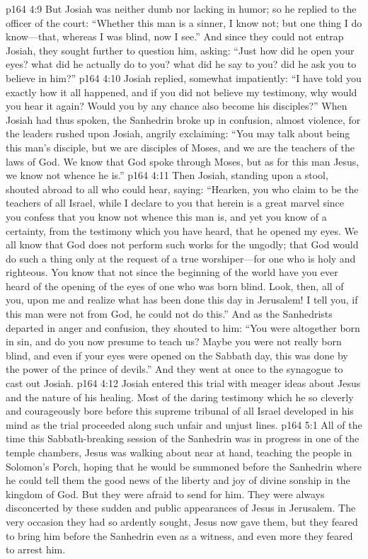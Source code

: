 \vs p164 4:9 But Josiah was neither dumb nor lacking in humor; so he replied to the officer of the court: “Whether this man is a sinner, I know not; but one thing I do know---that, whereas I was blind, now I see.” And since they could not entrap Josiah, they sought further to question him, asking: “Just how did he open your eyes? what did he actually do to you? what did he say to you? did he ask you to believe in him?”
\vs p164 4:10 Josiah replied, somewhat impatiently: “I have told you exactly how it all happened, and if you did not believe my testimony, why would you hear it again? Would you by any chance also become his disciples?” When Josiah had thus spoken, the Sanhedrin broke up in confusion, almost violence, for the leaders rushed upon Josiah, angrily exclaiming: “You may talk about being this man’s disciple, but we are disciples of Moses, and we are the teachers of the laws of God. We know that God spoke through Moses, but as for this man Jesus, we know not whence he is.”
\vs p164 4:11 Then Josiah, standing upon a stool, shouted abroad to all who could hear, saying: “Hearken, you who claim to be the teachers of all Israel, while I declare to you that herein is a great marvel since you confess that you know not whence this man is, and yet you know of a certainty, from the testimony which you have heard, that he opened my eyes. We all know that God does not perform such works for the ungodly; that God would do such a thing only at the request of a true worshiper---for one who is holy and righteous. You know that not since the beginning of the world have you ever heard of the opening of the eyes of one who was born blind. Look, then, all of you, upon me and realize what has been done this day in Jerusalem! I tell you, if this man were not from God, he could not do this.” And as the Sanhedrists departed in anger and confusion, they shouted to him: “You were altogether born in sin, and do you now presume to teach us? Maybe you were not really born blind, and even if your eyes were opened on the Sabbath day, this was done by the power of the prince of devils.” And they went at once to the synagogue to cast out Josiah.
\vs p164 4:12 Josiah entered this trial with meager ideas about Jesus and the nature of his healing. Most of the daring testimony which he so cleverly and courageously bore before this supreme tribunal of all Israel developed in his mind as the trial proceeded along such unfair and unjust lines.
\vs p164 5:1 All of the time this Sabbath\hyp{}breaking session of the Sanhedrin was in progress in one of the temple chambers, Jesus was walking about near at hand, teaching the people in Solomon’s Porch, hoping that he would be summoned before the Sanhedrin where he could tell them the good news of the liberty and joy of divine sonship in the kingdom of God. But they were afraid to send for him. They were always disconcerted by these sudden and public appearances of Jesus in Jerusalem. The very occasion they had so ardently sought, Jesus now gave them, but they feared to bring him before the Sanhedrin even as a witness, and even more they feared to arrest him.
